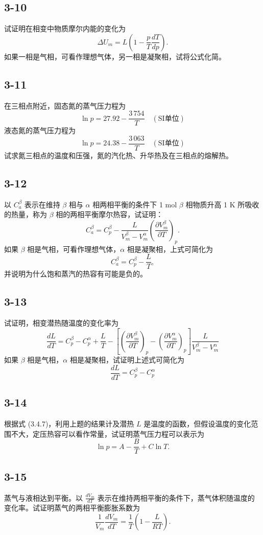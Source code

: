 \newpage
\subsection{3-10}
试证明在相变中物质摩尔内能的变化为
$$ \Delta U_m = L \left( 1 - \frac{p}{T} \frac{dT}{dp} \right). $$
如果一相是气相，可看作理想气体，另一相是凝聚相，试将公式化简。

\newpage
\subsection{3-11}
在三相点附近，固态氮的蒸气压力程为
$$ \ln p = 27.92 - \frac{3 \, 754}{T} \quad (\text{SI单位}) $$
液态氮的蒸气压力程为
$$ \ln p = 24.38 - \frac{3 \, 063}{T} \quad (\text{SI单位}) $$
试求氮三相点的温度和压强，氮的汽化热、升华热及在三相点的熔解热。

\newpage
\subsection{3-12}
以 $C_a^\beta$ 表示在维持 $\beta$ 相与 $\alpha$ 相两相平衡的条件下 1 mol $\beta$ 相物质升高 1 K 所吸收的热量，称为 $\beta$ 相的两相平衡摩尔热容，试证明：
$$ C_a^\beta = C_p^\beta - \frac{L}{V_m^\beta - V_m^\alpha} \left( \frac{\partial V_m^\beta}{\partial T} \right)_p. $$
如果 $\beta$ 相是气相，可看作理想气体，$\alpha$ 相是凝聚相，上式可简化为
$$ C_a^\beta = C_p^\beta - \frac{L}{T}, $$
并说明为什么饱和蒸汽的热容有可能是负的。

\newpage
\subsection{3-13}
试证明，相变潜热随温度的变化率为
$$ \frac{dL}{dT} = C_p^\beta - C_p^\alpha + \frac{L}{T} - \left[ \left( \frac{\partial V_m^\beta}{\partial T} \right)_p - \left( \frac{\partial V_m^\alpha}{\partial T} \right)_p \right] \frac{L}{V_m^\beta - V_m^\alpha} $$
如果 $\beta$ 相是气相，$\alpha$ 相是凝聚相，试证明上述式可简化为
$$ \frac{dL}{dT} = C_p^\beta - C_p^\alpha $$

\newpage
\subsection{3-14}
根据式 (3.4.7)，利用上题的结果计及潜热 $L$ 是温度的函数，但假设温度的变化范围不大，定压热容可以看作常量，试证明蒸气压力程可以表示为
$$ \ln p = A - \frac{B}{T} + C \ln T. $$

\newpage
\subsection{3-15}
蒸气与液相达到平衡。以 $\frac{dV_m}{dT}$ 表示在维持两相平衡的条件下，蒸气体积随温度的变化率。试证明蒸气的两相平衡膨胀系数为
$$ \frac{1}{V_m} \frac{dV_m}{dT} = \frac{1}{T} \left( 1 - \frac{L}{RT} \right). $$

